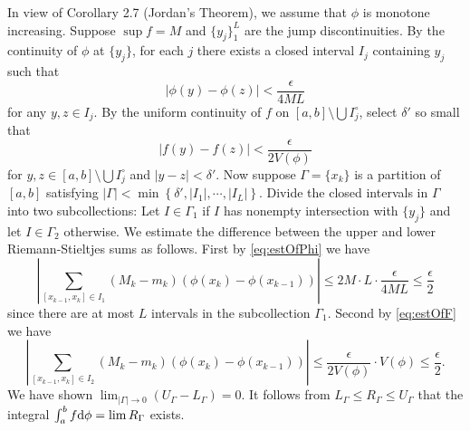 \begin{exercise}{2.16}
  In view of Corollary 2.7 (Jordan's Theorem),
  we assume that $\phi$ is monotone increasing.
  Suppose $\sup f = M$ and $\{y_j\}_1^L$ are the jump discontinuities.
  By the continuity of $\phi$ at $\{y_j\}$,
  for each $j$ there exists a closed interval $I_j$ containing $y_j$ such that
  \begin{equation}
    \left| \phi(y) - \phi(z) \right| < \frac{\epsilon}{4 M L}
    \label{eq:estOfPhi}
  \end{equation}
  for any $y, z \in I_j$.
  By the uniform continuity of $f$ on $[a,b] \setminus \bigcup I_j^\circ$,
  select $\delta'$ so small that
  \begin{equation}
    \left| f(y) - f(z) \right| < \frac{\epsilon}{2 V(\phi)}
    \label{eq:estOfF}
  \end{equation}
  for $y,z \in [a,b] \setminus \bigcup I_j^\circ$ and $|y-z| < \delta'$.
  Now suppose $\Gamma = \{x_k\}$ is a partition of $[a,b]$ satisfying
  $\left| \Gamma \right| < \min \left\{ \delta', |I_1|, \cdots, |I_L| \right\}$.
  Divide the closed intervals in $\Gamma$ into two subcollections:
  Let  $I \in \Gamma_1$
  if $I$ has nonempty intersection with $\{y_j\}$
  and let $I \in \Gamma_2$ otherwise.
  We estimate the difference between the upper and lower Riemann-Stieltjes sums as follows.
  First by \eqref{eq:estOfPhi} we have
  \[
    \left| \sum_{[x_{k-1}, x_k] \in I_1}
    \left( M_k - m_k \right) \left( \phi(x_k) - \phi(x_{k-1}) \right) \right|
    \le 2M \cdot L \cdot \frac{\epsilon}{4ML}
    \le \frac{\epsilon}{2}
  \]
  since there are at most $L$ intervals in the subcollection $\Gamma_1$.
  Second by \eqref{eq:estOfF} we have
  \[
    \left| \sum_{[x_{k-1}, x_k] \in I_2}
    \left( M_k - m_k \right) \left( \phi(x_k) - \phi(x_{k-1}) \right) \right|
    \le \frac{\epsilon}{2V(\phi)} \cdot V(\phi)
    \le \frac{\epsilon}{2}.
  \]
  We have shown $\lim_{|\Gamma| \rightarrow 0} (U_\Gamma - L_\Gamma) = 0$.
  It follows from $L_\Gamma \le R_\Gamma \le U_\Gamma$ that
  the integral $\int_a^b f \mathrm{d} \phi = \lim R_\Gamma$ exists.
\end{exercise}

